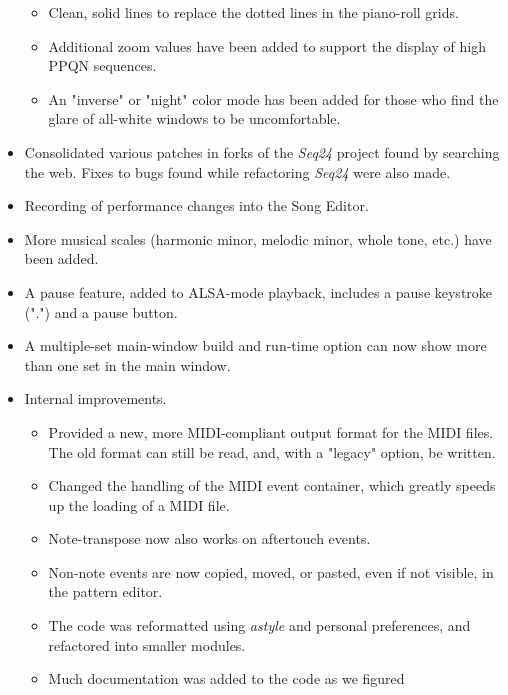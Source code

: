 \documentclass[
 11pt,
 twoside,
 a4paper,
 headinclude,
 footinclude,
 final                                 %
]{article}
\begin{document}
\begin{itemize}
\begin{itemize}
         \item Clean, solid lines to replace the dotted lines in the piano-roll
            grids.
         \item Additional zoom values have been added to support the display
            of high PPQN sequences.
         \item An "inverse" or "night" color mode has been added for those
            who find the glare of all-white windows to be uncomfortable.
      \end{itemize}
      \item Consolidated various patches in forks of the \textsl{Seq24}
         project found by searching the web.  Fixes to bugs found while
         refactoring \textsl{Seq24} were also made.
      \item Recording of performance changes into the Song Editor.
      \item More musical scales (harmonic minor, melodic minor,
         whole tone, etc.) have been added.
      \item A pause feature, added to ALSA-mode playback,
         includes a pause keystroke (".") and a pause button.
      \item A multiple-set main-window build and run-time option can now
         show more than one set in the main window.
      \item Internal improvements.
      \begin{itemize}
         \item Provided a new, more MIDI-compliant output format for the MIDI
            files.  The old format can still be read, and, with a "legacy"
            option, be written.
         \item Changed the handling of the MIDI event container, which greatly
            speeds up the loading of a MIDI file.
         \item Note-transpose now also works on aftertouch events.
         \item Non-note events are now copied, moved, or pasted, even if not
            visible, in the pattern editor.
         \item The code was reformatted using \textsl{astyle} and
            personal preferences, and refactored into smaller modules.
         \item Much documentation was added to the code as we figured

\end{itemize}
\end{itemize}
\end{document}
